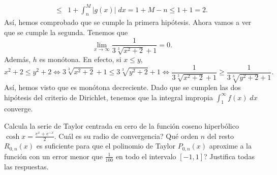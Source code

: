 \documentclass{article}
\begin{document}
\begin{sol}
\[\begin{split}
 \leq & 1 + \int^{M}_{n} \left|g\left(x\right)\right| \; dx = 1 + M-n \leq 1 + 1 = 2.
\end{split}
\]
Así, hemos comprobado que se cumple la primera hipótesis. Ahora vamos a ver que se cumple la segunda. Tenemos que 
\[\lim_{x \to \infty}\frac{1}{3\sqrt[3]{x^{2}+2}+1} = 0 .\]
Además, $\displaystyle h $ es monótona. En efecto, si $\displaystyle x \leq y $,
\[x^{2} + 2 \leq y^{2} + 2 \iff 3\sqrt[3]{x^{2}+2}+1 \leq 3\sqrt[3]{y^{2}+2}+1 \iff \frac{1}{3\sqrt[3]{x^{2}+2}+1} \geq \frac{1}{3\sqrt[3]{y^{2}+2}+1} .\]
Así, hemos visto que es monótona decreciente. Dado que se cumplen las dos hipótesis del criterio de Dirichlet, tenemos que la integral impropia $\displaystyle \int^{\infty}_{1} f\left(x\right) \; dx $ converge. 
\end{sol}
\begin{ej}
	Calcula la serie de Taylor centrada en cero de la función coseno hiperbólico $\displaystyle \cosh x = \frac{e^{x}+e^{-x}}{2} $. Cuál es su radio de convergencia? Qué orden $\displaystyle n $ del resto $\displaystyle R_{0,n}\left(x\right) $ es suficiente para que el polinomio de Taylor $\displaystyle P_{0,n}\left(x\right) $ aproxime a la función con un error menor que $\displaystyle \frac{1}{100} $ en todo el intervalo $\displaystyle \left[-1,1\right]  $? Justifica todas las respuestas.
\end{ej}
\end{document}

